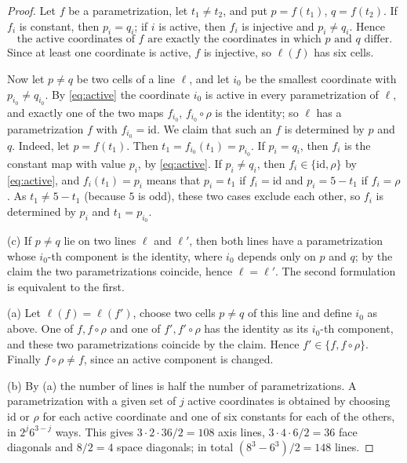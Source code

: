 \begin{proof}
Let $f$ be a parametrization, let $t_1\ne t_2$, and put $p=f(t_1)$, $q=f(t_2)$. If $f_i$ is constant, then
$p_i=q_i$; if $i$ is active, then $f_i$ is injective and $p_i\ne q_i$. Hence
\begin{equation}\label{eq:active}
  \text{the active coordinates of $f$ are exactly the coordinates in which $p$ and $q$ differ.}
\end{equation}
Since at least one coordinate is active, $f$ is injective, so $\ell(f)$ has six cells.

Now let $p\ne q$ be two cells of a line $\ell$, and let $i_0$ be the smallest coordinate with
$p_{i_0}\ne q_{i_0}$. By \eqref{eq:active} the coordinate $i_0$ is active in every parametrization of $\ell$,
and exactly one of the two maps $f_{i_0}$, $f_{i_0}\circ\rho$ is the identity; so $\ell$ has a
parametrization $f$ with $f_{i_0}=\mathrm{id}$. We claim that such an $f$ is determined by $p$ and $q$.
Indeed, let $p=f(t_1)$. Then $t_1=f_{i_0}(t_1)=p_{i_0}$. If $p_i=q_i$, then $f_i$ is the constant map with
value $p_i$, by \eqref{eq:active}. If $p_i\ne q_i$, then $f_i\in\{\mathrm{id},\rho\}$ by \eqref{eq:active},
and $f_i(t_1)=p_i$ means that $p_i=t_1$ if $f_i=\mathrm{id}$ and $p_i=5-t_1$ if $f_i=\rho$. As
$t_1\ne 5-t_1$ (because $5$ is odd), these two cases exclude each other, so $f_i$ is determined by $p_i$
and $t_1=p_{i_0}$.

(c) If $p\ne q$ lie on two lines $\ell$ and $\ell'$, then both lines have a parametrization whose
$i_0$-th component is the identity, where $i_0$ depends only on $p$ and $q$; by the claim the two
parametrizations coincide, hence $\ell=\ell'$. The second formulation is equivalent to the first.

(a) Let $\ell(f)=\ell(f')$, choose two cells $p\ne q$ of this line and define $i_0$ as above. One of
$f,f\circ\rho$ and one of $f',f'\circ\rho$ has the identity as its $i_0$-th component, and these two
parametrizations coincide by the claim. Hence $f'\in\{f,f\circ\rho\}$. Finally $f\circ\rho\ne f$, since an
active component is changed.

(b) By (a) the number of lines is half the number of parametrizations. A parametrization with a given set
of $j$ active coordinates is obtained by choosing $\mathrm{id}$ or $\rho$ for each active coordinate and one
of six constants for each of the others, in $2^j6^{3-j}$ ways. This gives $3\cdot 2\cdot 36/2=108$ axis
lines, $3\cdot 4\cdot 6/2=36$ face diagonals and $8/2=4$ space diagonals; in total
$(8^3-6^3)/2=148$ lines.
\end{proof}


